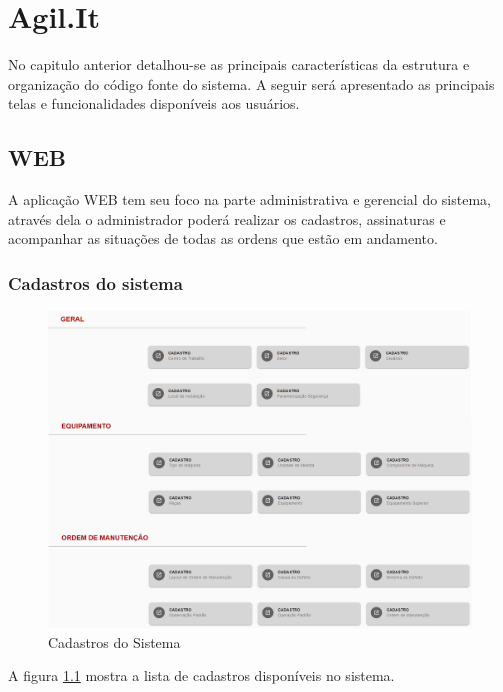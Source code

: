 \chapter{Agil.It}

No capitulo anterior detalhou-se as principais características da estrutura e organização do código fonte do sistema.
A seguir será apresentado as principais telas e funcionalidades disponíveis aos usuários.

\section{WEB}
A aplicação WEB tem seu foco na parte administrativa e gerencial do sistema, através dela o administrador poderá realizar os cadastros, assinaturas e acompanhar as situações de todas as ordens que estão em andamento.
\subsection{Cadastros do sistema}

\begin{figure}[H]
	\caption{\label{web-cadastros}Cadastros do Sistema}
	\begin{center}
		\includegraphics[scale=0.40]{./Figuras/agil.it/web-cadastros.png}
	\end{center}
\end{figure}

A figura \ref{web-cadastros} mostra a lista de cadastros disponíveis no sistema.

